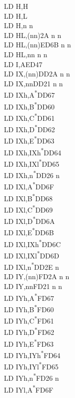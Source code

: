 \documentclass[twoside,openright,a4paper]{book}
\begin{document}
\begin{multicols}{3}
{\begin{tabbing}
	LD H,H\\
	LD H,L\\
	LD H,n n\\
	LD HL,(nn)\>2A n n\\
	LD HL,(nn)\>ED6B n n\\
	LD HL,nn n n\\
	LD I,A\>ED47\\
	LD IX,(nn)\>DD2A n n\\
	LD IX,nn\>DD21 n n\\
	LD IXh,A\textsuperscript{*}\>DD67\\
	LD IXh,B\textsuperscript{*}\>DD60\\
	LD IXh,C\textsuperscript{*}\>DD61\\
	LD IXh,D\textsuperscript{*}\>DD62\\
	LD IXh,E\textsuperscript{*}\>DD63\\
	LD IXh,IXh\textsuperscript{*}\>DD64\\
	LD IXh,IXl\textsuperscript{*}\>DD65\\
	LD IXh,n\textsuperscript{*}\>DD26 n \\
	LD IXl,A\textsuperscript{*}\>DD6F\\
	LD IXl,B\textsuperscript{*}\>DD68\\
	LD IXl,C\textsuperscript{*}\>DD69\\
	LD IXl,D\textsuperscript{*}\>DD6A\\
	LD IXl,E\textsuperscript{*}\>DD6B\\
	LD IXl,IXh\textsuperscript{*}\>DD6C\\
	LD IXl,IXl\textsuperscript{*}\>DD6D\\
	LD IXl,n\textsuperscript{*}\>DD2E n\\
	LD IY,(nn)\>FD2A n n\\
	LD IY,nn\>FD21 n n\\
	LD IYh,A\textsuperscript{*}\>FD67\\
	LD IYh,B\textsuperscript{*}\>FD60\\
	LD IYh,C\textsuperscript{*}\>FD61\\
	LD IYh,D\textsuperscript{*}\>FD62\\
	LD IYh,E\textsuperscript{*}\>FD63\\
	LD IYh,IYh\textsuperscript{*}\>FD64\\
	LD IYh,IYl\textsuperscript{*}\>FD65\\
	LD IYh,n\textsuperscript{*}\>FD26 n\\
	LD IYl,A\textsuperscript{*}\>FD6F\\

\end{tabbing}}
\end{multicols}
\end{document}
